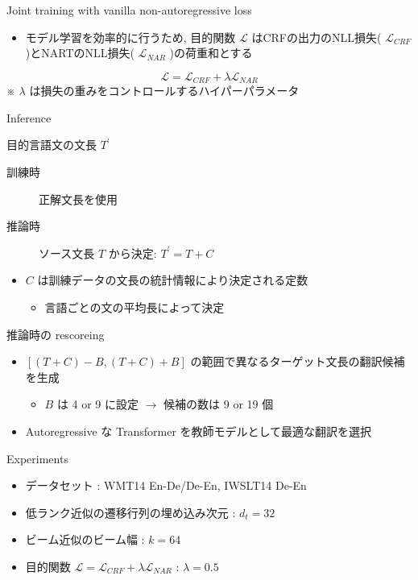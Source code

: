 \documentclass[unicode, 12pt, aspectratio=43]{beamer}
\begin{document}
\begin{frame}[label={sec:org3c9983c}]{\large Joint training with vanilla non-autoregressive loss}
\begin{itemize}
\item モデル学習を効率的に行うため, 目的関数 \(\mathcal{L}\) はCRFの出力のNLL損失( \(\mathcal{L}_{CRF}\) )とNARTのNLL損失( \(\mathcal{L}_{NAR}\) )の荷重和とする
\end{itemize}

\begin{equation*}
    \mathcal{L} = \mathcal{L}_{CRF} + \lambda \mathcal{L}_{NAR}
\end{equation*}
※ \(\lambda\) は損失の重みをコントロールするハイパーパラメータ
\end{frame}

\begin{frame}[label={sec:org88f175b}]{Inference}
\begin{block}{目的言語文の文長 \(T^\prime\)}
\begin{description}
\item[{訓練時}] 正解文長を使用
\item[{推論時}] ソース文長 \(T\) から決定: \(T^\prime = T+C\)
\end{description}
\begin{itemize}
\item \(C\) は訓練データの文長の統計情報により決定される定数
\begin{itemize}
\item 言語ごとの文の平均長によって決定
\end{itemize}
\end{itemize}
\end{block}

\begin{block}{推論時の rescoreing}
\begin{itemize}
\item \([(T+C)-B, (T+C) + B]\) の範囲で異なるターゲット文長の翻訳候補を生成
\begin{itemize}
\item \(B\) は 4 or 9 に設定 \(\rightarrow\) 候補の数は 9 or 19 個
\end{itemize}
\item Autoregressive な Transformer を教師モデルとして最適な翻訳を選択
\end{itemize}
\end{block}
\end{frame}

\begin{frame}[label={sec:org09bcb0f}]{Experiments}
\begin{itemize}
\item データセット : WMT14 En-De/De-En, IWSLT14 De-En
\item 低ランク近似の遷移行列の埋め込み次元 : \(d_t = 32\)
\item ビーム近似のビーム幅 : \(k = 64\)
\item 目的関数 \(\mathcal{L} = \mathcal{L}_{CRF} + \lambda \mathcal{L}_{NAR}\) : \(\lambda = 0.5\)
\end{itemize}
\end{frame}
\end{document}
